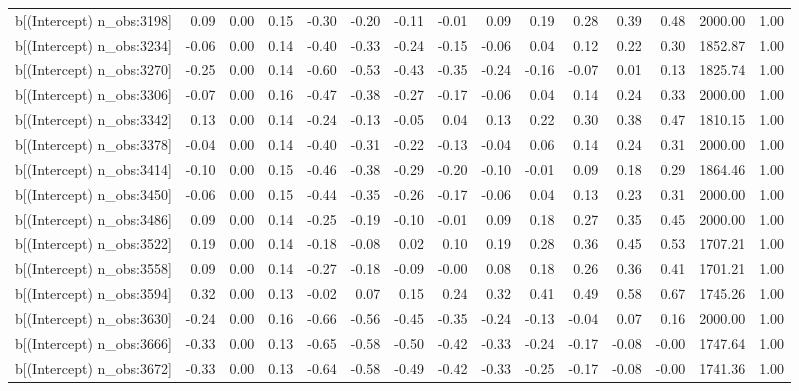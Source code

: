 \begin{table}[ht]
\begin{tabular}{rrrrrrrrrrrrrrr}
  b[(Intercept) n\_obs:3198] & 0.09 & 0.00 & 0.15 & -0.30 & -0.20 & -0.11 & -0.01 & 0.09 & 0.19 & 0.28 & 0.39 & 0.48 & 2000.00 & 1.00 \\ 
  b[(Intercept) n\_obs:3234] & -0.06 & 0.00 & 0.14 & -0.40 & -0.33 & -0.24 & -0.15 & -0.06 & 0.04 & 0.12 & 0.22 & 0.30 & 1852.87 & 1.00 \\ 
  b[(Intercept) n\_obs:3270] & -0.25 & 0.00 & 0.14 & -0.60 & -0.53 & -0.43 & -0.35 & -0.24 & -0.16 & -0.07 & 0.01 & 0.13 & 1825.74 & 1.00 \\ 
  b[(Intercept) n\_obs:3306] & -0.07 & 0.00 & 0.16 & -0.47 & -0.38 & -0.27 & -0.17 & -0.06 & 0.04 & 0.14 & 0.24 & 0.33 & 2000.00 & 1.00 \\ 
  b[(Intercept) n\_obs:3342] & 0.13 & 0.00 & 0.14 & -0.24 & -0.13 & -0.05 & 0.04 & 0.13 & 0.22 & 0.30 & 0.38 & 0.47 & 1810.15 & 1.00 \\ 
  b[(Intercept) n\_obs:3378] & -0.04 & 0.00 & 0.14 & -0.40 & -0.31 & -0.22 & -0.13 & -0.04 & 0.06 & 0.14 & 0.24 & 0.31 & 2000.00 & 1.00 \\ 
  b[(Intercept) n\_obs:3414] & -0.10 & 0.00 & 0.15 & -0.46 & -0.38 & -0.29 & -0.20 & -0.10 & -0.01 & 0.09 & 0.18 & 0.29 & 1864.46 & 1.00 \\ 
  b[(Intercept) n\_obs:3450] & -0.06 & 0.00 & 0.15 & -0.44 & -0.35 & -0.26 & -0.17 & -0.06 & 0.04 & 0.13 & 0.23 & 0.31 & 2000.00 & 1.00 \\ 
  b[(Intercept) n\_obs:3486] & 0.09 & 0.00 & 0.14 & -0.25 & -0.19 & -0.10 & -0.01 & 0.09 & 0.18 & 0.27 & 0.35 & 0.45 & 2000.00 & 1.00 \\ 
  b[(Intercept) n\_obs:3522] & 0.19 & 0.00 & 0.14 & -0.18 & -0.08 & 0.02 & 0.10 & 0.19 & 0.28 & 0.36 & 0.45 & 0.53 & 1707.21 & 1.00 \\ 
  b[(Intercept) n\_obs:3558] & 0.09 & 0.00 & 0.14 & -0.27 & -0.18 & -0.09 & -0.00 & 0.08 & 0.18 & 0.26 & 0.36 & 0.41 & 1701.21 & 1.00 \\ 
  b[(Intercept) n\_obs:3594] & 0.32 & 0.00 & 0.13 & -0.02 & 0.07 & 0.15 & 0.24 & 0.32 & 0.41 & 0.49 & 0.58 & 0.67 & 1745.26 & 1.00 \\ 
  b[(Intercept) n\_obs:3630] & -0.24 & 0.00 & 0.16 & -0.66 & -0.56 & -0.45 & -0.35 & -0.24 & -0.13 & -0.04 & 0.07 & 0.16 & 2000.00 & 1.00 \\ 
  b[(Intercept) n\_obs:3666] & -0.33 & 0.00 & 0.13 & -0.65 & -0.58 & -0.50 & -0.42 & -0.33 & -0.24 & -0.17 & -0.08 & -0.00 & 1747.64 & 1.00 \\ 
  b[(Intercept) n\_obs:3672] & -0.33 & 0.00 & 0.13 & -0.64 & -0.58 & -0.49 & -0.42 & -0.33 & -0.25 & -0.17 & -0.08 & -0.00 & 1741.36 & 1.00 \\ 

\end{tabular}
\end{table}
